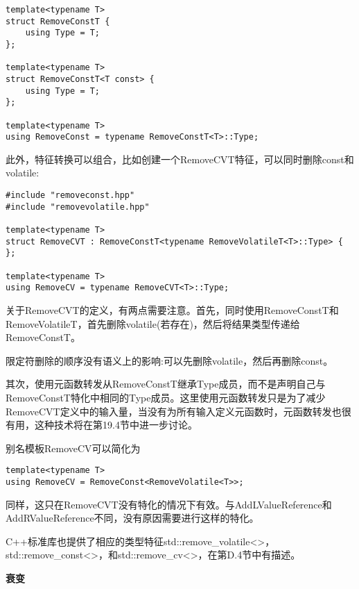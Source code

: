 \begin{lstlisting}[style=styleCXX]
template<typename T>
struct RemoveConstT {
	using Type = T;
};

template<typename T>
struct RemoveConstT<T const> {
	using Type = T;
};

template<typename T>
using RemoveConst = typename RemoveConstT<T>::Type;
\end{lstlisting}

此外，特征转换可以组合，比如创建一个RemoveCVT特征，可以同时删除const和volatile:

\begin{lstlisting}[style=styleCXX]
#include "removeconst.hpp"
#include "removevolatile.hpp"

template<typename T>
struct RemoveCVT : RemoveConstT<typename RemoveVolatileT<T>::Type> {
};

template<typename T>
using RemoveCV = typename RemoveCVT<T>::Type;
\end{lstlisting}

关于RemoveCVT的定义，有两点需要注意。首先，同时使用RemoveConstT和RemoveVolatileT，首先删除volatile(若存在)，然后将结果类型传递给RemoveConstT。

\begin{tcolorbox}[colback=webgreen!5!white,colframe=webgreen!75!black]
\hspace*{0.75cm}限定符删除的顺序没有语义上的影响:可以先删除volatile，然后再删除const。
\end{tcolorbox}

其次，使用元函数转发从RemoveConstT继承Type成员，而不是声明自己与RemoveConstT特化中相同的Type成员。这里使用元函数转发只是为了减少RemoveCVT定义中的输入量，当没有为所有输入定义元函数时，元函数转发也很有用，这种技术将在第19.4节中进一步讨论。

别名模板RemoveCV可以简化为

\begin{lstlisting}[style=styleCXX]
template<typename T>
using RemoveCV = RemoveConst<RemoveVolatile<T>>;
\end{lstlisting}

同样，这只在RemoveCVT没有特化的情况下有效。与AddLValueReference和AddRValueReference不同，没有原因需要进行这样的特化。

C++标准库也提供了相应的类型特征std::remove\_volatile<>， std::remove\_const<>，和std::remove\_cv<>，在第D.4节中有描述。

\noindent
\textbf{衰变}


